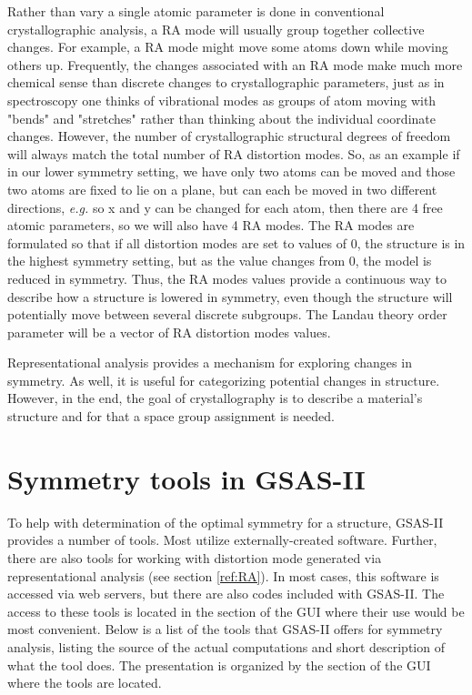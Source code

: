Rather than vary a single atomic parameter is done in conventional crystallographic analysis, a RA mode will usually group together collective changes. For example, a RA mode might move some atoms down while moving others up. Frequently, the changes associated with an RA mode make much more chemical sense than discrete changes to crystallographic parameters, just as in spectroscopy one thinks of vibrational modes as groups of atom moving with "bends" and "stretches" rather than thinking about the individual coordinate changes. However, the number of crystallographic structural degrees of freedom will always match the total number of RA distortion modes. So, as an example if in our lower symmetry setting, we have only two atoms can be moved and those two atoms are fixed to lie on a plane, but can each be moved in two different directions, \textit{e.g.} so x and y can be changed for each atom, then there are 4 free atomic parameters, so we will also have 4 RA modes. The RA modes are formulated so that if all distortion modes are set to values of 0, the structure is in the highest symmetry setting, but as the value changes from 0, the model is reduced in symmetry. Thus, the RA modes values provide a continuous way to describe how a structure is lowered in symmetry, even though the structure will potentially move between several discrete subgroups. The Landau theory order parameter will be a vector of RA distortion modes values. 

Representational analysis provides a mechanism for exploring changes in symmetry. As well, it is useful for  categorizing potential changes in structure. However, in the end, the goal of crystallography is to describe a material's structure and for that a space group assignment is needed. 

\section{Symmetry tools in GSAS-II}

To help with determination of the optimal symmetry for a structure, GSAS-II provides a number of tools. 
Most utilize externally-created software. 
Further, there are also tools for working with distortion mode generated via representational analysis (see section \ref{ref:RA}). 
In most cases, this software is accessed via web servers, but there are also codes included with GSAS-II. 
The access to these tools is located in the section of the GUI where their use would be most convenient. 
Below is a list of the tools that GSAS-II offers for symmetry analysis, listing the 
source of the actual computations and short description of what the tool does. The presentation is organized by the section of the GUI where the tools are located.

